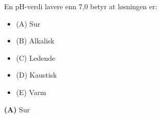 

En pH-verdi lavere enn 7,0 betyr at løsningen er:

\begin{itemize}
\item{(A)} Sur
\vskip 5pt 
\item{(B)} Alkalisk
\vskip 5pt 
\item{(C)} Ledende
\vskip 5pt 
\item{(D)} Kaustisk
\vskip 5pt 
\item{(E)} Varm
\end{itemize}







{\bf (A)} Sur
 







